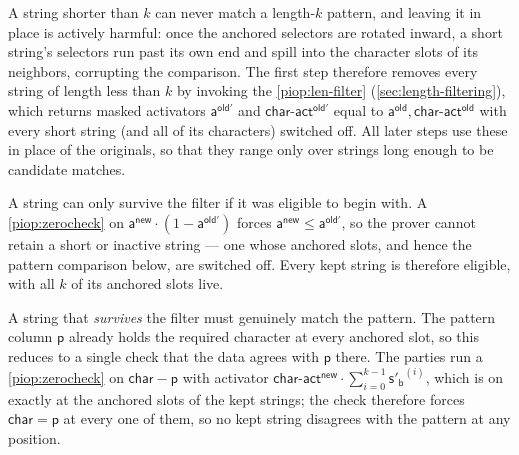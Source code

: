  A string shorter than $k$ can never match a length-$k$ pattern, and leaving it in place is actively harmful: once the anchored selectors are rotated inward, a short string's selectors run past its own end and spill into the character slots of its neighbors, corrupting the comparison. The first step therefore removes every string of length less than $k$ by invoking the \cref{piop:len-filter} (\cref{sec:length-filtering}), which returns masked activators $\mathsf{a^{old'}}$ and $\mathsf{char\text{-}act^{old'}}$ equal to $\mathsf{a^{old}}, \mathsf{char\text{-}act^{old}}$ with every short string (and all of its characters) switched off. All later steps use these in place of the originals, so that they range only over strings long enough to be candidate matches.



 A string can only survive the filter if it was eligible to begin with. A \cref{piop:zerocheck} on $\mathsf{a^{new}}\cdot(1-\mathsf{a^{old'}})$ forces $\mathsf{a^{new}}\leq\mathsf{a^{old'}}$, so the prover cannot retain a short or inactive string --- one whose anchored slots, and hence the pattern comparison below, are switched off. Every kept string is therefore eligible, with all $k$ of its anchored slots live.

 A string that \emph{survives} the filter must genuinely match the pattern. The pattern column $\mathsf{p}$ already holds the required character at every anchored slot, so this reduces to a single check that the data agrees with $\mathsf{p}$ there. The parties run a \cref{piop:zerocheck} on $\mathsf{char}-\mathsf{p}$ with activator $\mathsf{char\text{-}act^{new}}\cdot\sum_{i=0}^{k-1}\mathsf{s'_b}^{(i)}$, which is on exactly at the anchored slots of the kept strings; the check therefore forces $\mathsf{char}=\mathsf{p}$ at every one of them, so no kept string disagrees with the pattern at any position.

